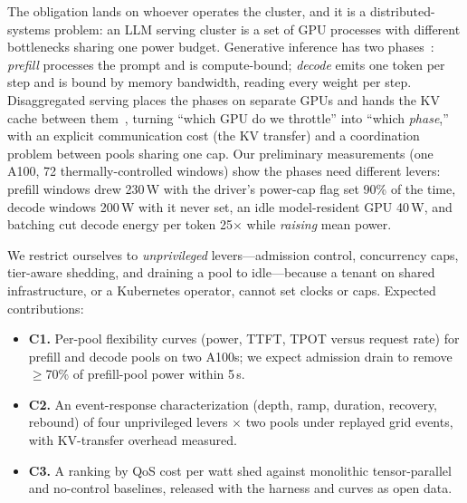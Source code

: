 \documentclass[conference,10pt]{IEEEtran}
\begin{document}
The obligation lands on whoever operates the cluster, and it is a distributed-systems problem: an LLM serving cluster is a set of GPU processes with different bottlenecks sharing one power budget. Generative inference has two phases~\cite{patel2024splitwise}: \emph{prefill} processes the prompt and is compute-bound; \emph{decode} emits one token per step and is bound by memory bandwidth, reading every weight per step. Disaggregated serving places the phases on separate GPUs and hands the KV cache between them~\cite{zhong2024distserve,qin2025mooncake}, turning ``which GPU do we throttle'' into ``which \emph{phase},'' with an explicit communication cost (the KV transfer) and a coordination problem between pools sharing one cap. Our preliminary measurements (one A100, 72 thermally-controlled windows) show the phases need different levers: prefill windows drew 230\,W with the driver's power-cap flag set 90\% of the time, decode windows 200\,W with it never set, an idle model-resident GPU 40\,W, and batching cut decode energy per token 25$\times$ while \emph{raising} mean power.

We restrict ourselves to \emph{unprivileged} levers---admission control, concurrency caps, tier-aware shedding, and draining a pool to idle---because a tenant on shared infrastructure, or a Kubernetes operator, cannot set clocks or caps. Expected contributions:
\begin{itemize}
\item \textbf{C1.} Per-pool flexibility curves (power, TTFT, TPOT versus request rate) for prefill and decode pools on two A100s; we expect admission drain to remove $\geq$70\% of prefill-pool power within 5\,s.
\item \textbf{C2.} An event-response characterization (depth, ramp, duration, recovery, rebound) of four unprivileged levers $\times$ two pools under replayed grid events, with KV-transfer overhead measured.
\item \textbf{C3.} A ranking by QoS cost per watt shed against monolithic tensor-parallel and no-control baselines, released with the harness and curves as open data.
\end{itemize}
\end{document}
